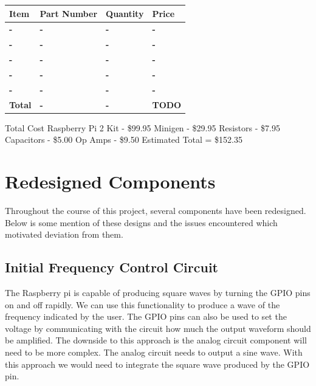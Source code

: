 \documentclass{article}	%
\begin{document}
\begin{multicols}{2}
\begin{center}
    \begin{tabularx}{0.4\textwidth}{|X|X|X|X|}
        \hline

        \textbf{Item} &
        \textbf{Part Number} &
        \textbf{Quantity} &
        \textbf{Price} \\
        \hline

        \textbf{-} &
        \textbf{-} &
        \textbf{-} &
        \textbf{-} \\
        \hline

        \textbf{-} &
        \textbf{-} &
        \textbf{-} &
        \textbf{-} \\
        \hline

        \textbf{-} &
        \textbf{-} &
        \textbf{-} &
        \textbf{-} \\
        \hline

        \textbf{-} &
        \textbf{-} &
        \textbf{-} &
        \textbf{-} \\
        \hline

        \textbf{-} &
        \textbf{-} &
        \textbf{-} &
        \textbf{-} \\
        \hline

        \textbf{Total} &
        \textbf{-} &
        \textbf{-} &
        \textbf{TODO} \\

        \hline
    \end{tabularx}
\end{center}

Total Cost
Raspberry Pi 2 Kit - \$99.95
Minigen - \$29.95
Resistors - \$7.95
Capacitors - \$5.00
Op Amps - \$9.50
Estimated Total = \$152.35

\section{Redesigned Components}
Throughout the course of this project,
several components have been redesigned.
Below is some mention of these designs and
the issues encountered which motivated deviation from them.

\subsection{Initial Frequency Control Circuit}
The Raspberry pi is capable of producing square waves by turning the GPIO pins on and off rapidly. We can use this functionality to produce a wave of the frequency indicated by the user. The GPIO pins can also be used to set the voltage by communicating with the circuit how much the output waveform should be amplified. The downside to this approach is the analog circuit component will need to be more complex. The analog circuit needs to output a sine wave. With this approach we would need to integrate the square wave produced by the GPIO pin.


\end{multicols}
\end{document}
